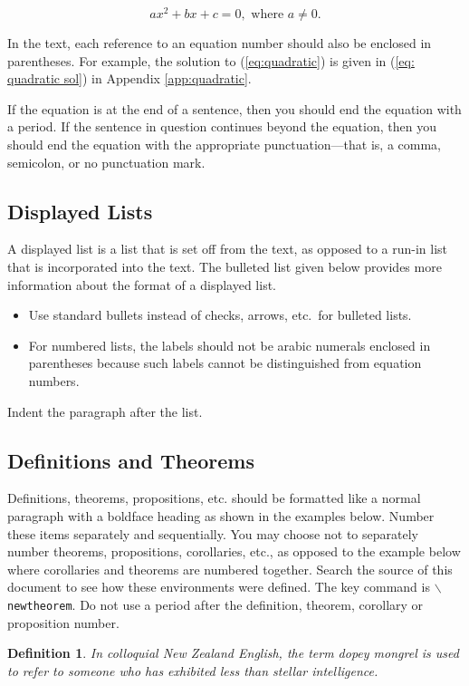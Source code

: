 \documentclass{wscpaperproc}
\theoremstyle{wsc}
\newtheorem{definition}{Definition}
\begin{document}
\begin{equation} \label{eq:quadratic}
ax^2 + bx + c = 0, \mbox{ where } a \ne 0.
\end{equation}

In the text, each reference to an equation number should also be enclosed in parentheses. For example, the solution to (\ref{eq:quadratic}) is given in (\ref{eq: quadratic sol}) in Appendix \ref{app:quadratic}.

If the equation is at the end of a sentence, then you should end the equation with a period. If the sentence in question continues beyond the equation, then you should end the equation with the appropriate punctuation---that is, a comma, semicolon, or no punctuation mark.

\subsection{Displayed Lists}
A displayed list is a list that is set off from the text, as opposed to a run-in list that is incorporated into the text. The bulleted list given below provides more information about the format of a displayed list.

\begin{itemize}
	\item Use standard bullets instead of checks, arrows, etc.\ for bulleted lists.
	\item For numbered lists, the labels should not be arabic numerals enclosed in parentheses because such labels cannot be distinguished from equation numbers.
\end{itemize}

Indent the paragraph after the list.


\subsection{Definitions and Theorems}
Definitions, theorems, propositions, etc. should be formatted like a normal paragraph with a boldface heading as shown in the examples below. Number
these items separately and sequentially. You may choose not to separately number theorems, propositions, corollaries, etc., as opposed to the example below where corollaries and theorems are numbered together. Search the source of this document to see how these environments were defined. The key
command is {\tt $\backslash$newtheorem}. Do not use a period after the definition, theorem, corollary or proposition number.

\begin{definition}
In colloquial New Zealand English, the term {\em dopey mongrel} is used to refer to someone who has exhibited less than stellar intelligence.
\end{definition}
\end{document}
